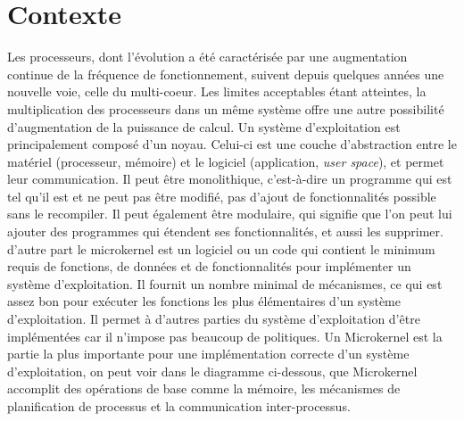 \documentclass[a4paper, 12pt]{article}
\begin{document}
\newpage		
\tableofcontents %



\clearpage 


\section{Contexte}
Les processeurs, dont l’évolution a été caractérisée par une augmentation continue de la fréquence de fonctionnement, suivent depuis quelques années une nouvelle voie, celle du multi-coeur.
Les limites acceptables étant atteintes, la multiplication des processeurs dans un même système offre une autre possibilité d’augmentation de la puissance de calcul.
\newline 
Un système d'exploitation est principalement composé d'un noyau. Celui-ci est une couche d'abstraction entre le matériel (processeur, mémoire) et le logiciel (application, \emph{user space}), et permet leur communication. Il peut être monolithique, c'est-à-dire un programme qui est tel qu'il est et ne peut pas être modifié, pas d'ajout de fonctionnalités possible sans le recompiler. Il peut également être modulaire, qui signifie que l'on peut lui ajouter des programmes qui étendent ses fonctionnalités, et aussi les supprimer.
\newline
d'autre part le microkernel est un logiciel ou un code qui contient le minimum requis de fonctions, de données et de fonctionnalités pour implémenter un système d'exploitation. Il fournit un nombre minimal de mécanismes, ce qui est assez bon pour exécuter les fonctions les plus élémentaires d'un système d'exploitation. Il permet à d'autres parties du système d'exploitation d'être implémentées car il n'impose pas beaucoup de politiques.
\newline
Un Microkernel est la partie la plus importante pour une implémentation correcte d'un système d'exploitation, on peut voir dans le diagramme ci-dessous, que Microkernel accomplit des opérations de base comme la mémoire, les mécanismes de planification de processus et la communication inter-processus.
\end{document}
